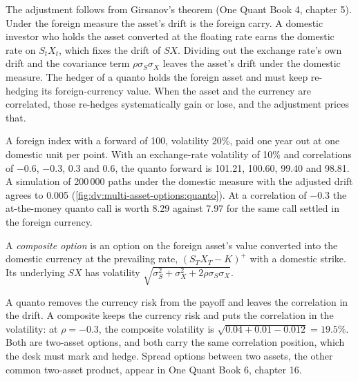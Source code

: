 The adjustment follows from Girsanov's theorem (One Quant Book 4, chapter 5). Under the foreign measure the asset's drift
is the foreign carry. A domestic investor who holds the asset converted at the floating rate earns the domestic rate on
$S_tX_t$, which fixes the drift of $SX$. Dividing out the exchange rate's own drift and the covariance term
$\rho\sigma_S\sigma_X$ leaves the asset's drift under the domestic measure. The hedger of a quanto holds the foreign asset
and must keep re-hedging its foreign-currency value. When the asset and the currency are correlated, those re-hedges
systematically gain or lose, and the adjustment prices that.

\begin{example}\label{ex:dv:multi-asset-options:quanto}
A foreign index with a forward of 100, volatility 20\%, paid one year out at one domestic unit per point. With an
exchange-rate volatility of 10\% and correlations of $-0.6$, $-0.3$, $0.3$ and $0.6$, the quanto forward is 101.21, 100.60,
99.40 and 98.81. A simulation of 200\,000 paths under the domestic measure with the adjusted drift agrees to 0.005
(\cref{fig:dv:multi-asset-options:quanto}). At a correlation of $-0.3$ the at-the-money quanto call is worth 8.29 against
7.97 for the same call settled in the foreign currency.
\end{example}

\begin{definition}\label{def:dv:multi-asset-options:composite}
A \emph{composite option} is an option on the foreign asset's value converted into the domestic
currency at the prevailing rate, $(S_TX_T-K)^+$ with a domestic strike. Its underlying $SX$ has volatility
$\sqrt{\sigma_S^2+\sigma_X^2+2\rho\sigma_S\sigma_X}$.
\end{definition}

A quanto removes the currency risk from the payoff and leaves the correlation in the drift. A composite keeps the currency
risk and puts the correlation in the volatility: at $\rho=-0.3$, the composite volatility is $\sqrt{0.04+0.01-0.012}=19.5\%$.
Both are two-asset options, and both carry the same correlation position, which the desk must mark and hedge. Spread options
between two assets, the other common two-asset product, appear in One Quant Book 6, chapter 16.


